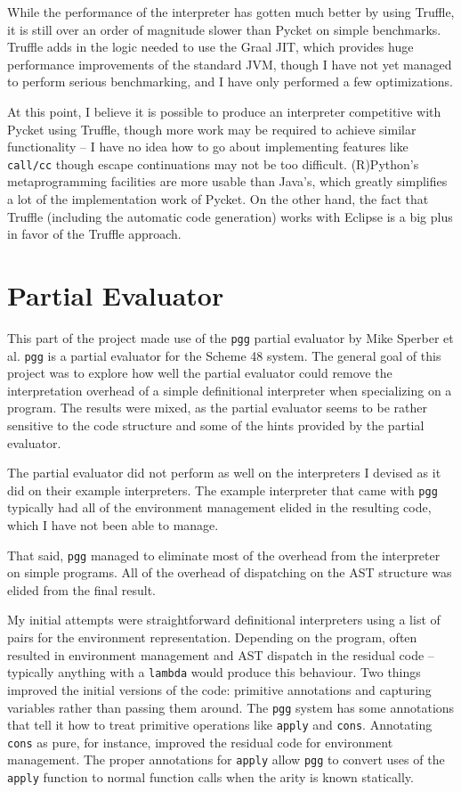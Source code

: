 \documentclass[8pt]{article}
\begin{document}
While the performance of the interpreter has gotten much better by using Truffle,
it is still over an order of magnitude slower than Pycket on simple benchmarks.
Truffle adds in the logic needed to use the Graal JIT, which provides huge
performance improvements of the standard JVM, though I have not yet managed to
perform serious benchmarking, and I have only performed a few optimizations.

At this point, I believe it is possible to produce an interpreter competitive
with Pycket using Truffle, though more work may be required to achieve similar
functionality -- I have no idea how to go about implementing features like
\texttt{call/cc} though escape continuations may not be too difficult.
(R)Python's metaprogramming facilities are more usable than Java's, which greatly
simplifies a lot of the implementation work of Pycket.
On the other hand, the fact that Truffle (including the automatic code generation)
works with Eclipse is a big plus in favor of the Truffle approach.

\section{Partial Evaluator}

This part of the project made use of the \texttt{pgg} partial evaluator by Mike
Sperber et al.
\texttt{pgg} is a partial evaluator for the Scheme 48 system.
The general goal of this project was to explore how well the partial evaluator
could remove the interpretation overhead of a simple definitional interpreter when
specializing on a program.
The results were mixed, as the partial evaluator seems to be rather sensitive to
the code structure and some of the hints provided by the partial evaluator.

The partial evaluator did not perform as well on the interpreters I devised as it
did on their example interpreters.
The example interpreter that came with \texttt{pgg} typically had all of the
environment management elided in the resulting code, which I have not been able
to manage.

That said, \texttt{pgg} managed to eliminate most of the overhead from the
interpreter on simple programs.
All of the overhead of dispatching on the AST structure was elided from the
final result.

My initial attempts were straightforward definitional interpreters using a list
of pairs for the environment representation.
Depending on the program, often resulted in environment management and AST
dispatch in the residual code -- typically anything with a \texttt{lambda} would
produce this behaviour.
Two things improved the initial versions of the code: primitive annotations and
capturing variables rather than passing them around.
The \texttt{pgg} system has some annotations that tell it how to treat primitive
operations like \texttt{apply} and \texttt{cons}.
Annotating \texttt{cons} as pure, for instance, improved the residual code for
environment management.
The proper annotations for \texttt{apply} allow \texttt{pgg} to convert uses of
the \texttt{apply} function to normal function calls when the arity is known
statically.
\end{document}
